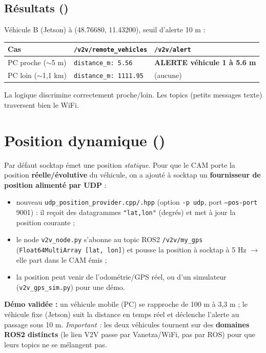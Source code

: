\documentclass[a4paper,11pt]{article}
\newcommand{\ok}{\textcolor{success}{\checkmark}}
\begin{document}
\subsection{Résultats (\ok)}
Véhicule B (Jetson) à (48.76680, 11.43200), seuil d'alerte 10 m :
\begin{center}
\begin{tabular}{@{}lll@{}}
\toprule
Cas & \texttt{/v2v/remote\_vehicles} & \texttt{/v2v/alert} \\
\midrule
PC proche ($\sim$5 m) & \texttt{distance\_m: 5.56} & \textbf{ALERTE véhicule 1 à 5.6 m} \\
PC loin ($\sim$1,1 km) & \texttt{distance\_m: 1111.95} & (aucune) \\
\bottomrule
\end{tabular}
\end{center}
La logique discrimine correctement proche/loin. Les topics (petits messages
texte) traversent bien le WiFi.

\section{Position dynamique (\ok)}
Par défaut socktap émet une position \emph{statique}. Pour que le CAM porte la
position \textbf{réelle/évolutive} du véhicule, on a ajouté à socktap un
\textbf{fournisseur de position alimenté par UDP} :
\begin{itemize}[leftmargin=1.4em]
  \item nouveau \texttt{udp\_position\_provider.cpp/.hpp} (option \texttt{-p udp},
        port \texttt{--pos-port} 9001) : il reçoit des datagrammes
        \texttt{"lat,lon"} (degrés) et met à jour la position courante ;
  \item le node \texttt{v2v\_node.py} s'abonne au topic ROS2
        \texttt{/v2v/my\_gps} (\texttt{Float64MultiArray [lat, lon]}) et pousse la
        position à socktap à 5 Hz $\rightarrow$ elle part dans le CAM émis ;
  \item la position peut venir de l'odométrie/GPS réel, ou d'un simulateur
        (\texttt{v2v\_gps\_sim.py}) pour une démo.
\end{itemize}
\textbf{Démo validée :} un véhicule mobile (PC) se rapproche de 100 m à 3,3 m ; le
véhicule fixe (Jetson) suit la distance en temps réel et déclenche l'alerte au
passage sous 10 m. \emph{Important :} les deux véhicules tournent sur des
\textbf{domaines ROS2 distincts} (le lien V2V passe par Vanetza/WiFi, pas par ROS)
pour que leurs topics ne se mélangent pas.
\end{document}
